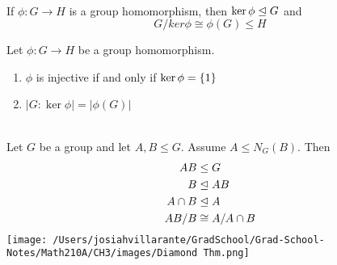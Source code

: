 \begin{theorem} \leavevmode \\
    \label{thm16}
    If $\phi: G \to H$ is a group homomorphism, then $\ker\phi \trianglelefteq G$ and 
    $$G/ker\phi \cong \phi(G) \leq H$$
\end{theorem}

\begin{corollary}
    Let $\phi: G \to H$ be a group homomorphism.
    \begin{enumerate}
        \item $\phi$ is injective if and only if $\ker\phi = \left\{1\right\}$
        \item $|G:\ker\phi| = |\phi(G)|$
    \end{enumerate}
\end{corollary}

\begin{theorem} \leavevmode \\
    \label{thm18}
    Let $G$ be a group and let $A, B \leq G$. Assume $A \leq N_G(B)$. Then 
    \begin{align*}
        AB &\leq G \\
        B &\trianglelefteq AB \\
        A\cap B &\trianglelefteq A \\
        AB/B &\cong A/A\cap B
    \end{align*}
    \texttt{[image: /Users/josiahvillarante/GradSchool/Grad-School-Notes/Math210A/CH3/images/Diamond Thm.png]}
\end{theorem}

